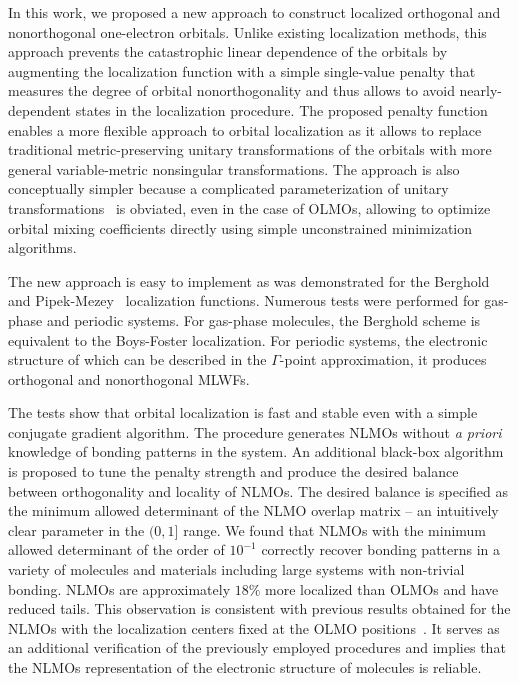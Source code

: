 \documentclass[aps,prl,reprint,amsmath,amssymb]{revtex4-1}
\begin{document}
In this work, we proposed a new approach to construct localized orthogonal and nonorthogonal one-electron orbitals. 
Unlike existing localization methods, this approach prevents the catastrophic linear dependence of the orbitals by augmenting the localization function with a simple single-value penalty that measures the degree of orbital nonorthogonality and thus allows to avoid nearly-dependent states in the localization procedure.
%
The proposed penalty function enables a more flexible approach to orbital localization as it allows to replace traditional metric-preserving unitary transformations of the orbitals with more general variable-metric nonsingular transformations. The approach is also conceptually simpler because a complicated parameterization of unitary transformations~\cite{hoyvik2017generalising} is obviated, even in the case of OLMOs, allowing to optimize orbital mixing coefficients directly using simple unconstrained minimization algorithms. 

The new approach is easy to implement as was demonstrated for the Berghold~\cite{berghold2000general} and Pipek-Mezey~\cite{pipek1989fast} localization functions. 
Numerous tests were performed for gas-phase and periodic systems. For gas-phase molecules, the Berghold scheme is equivalent to the Boys-Foster localization. 
For periodic systems, the electronic structure of which can be described in the $\Gamma$-point approximation, it produces orthogonal and nonorthogonal MLWFs. 

The tests show that orbital localization is fast and stable even with a simple conjugate gradient algorithm. The procedure generates NLMOs without \emph{a priori} knowledge of bonding patterns in the system. 
An additional black-box algorithm is proposed to tune the penalty strength and produce the desired balance between orthogonality and locality of NLMOs. The desired balance is specified as the minimum allowed determinant of the NLMO overlap matrix -- an intuitively clear parameter in the $(0,1]$ range. 
We found that NLMOs with the minimum allowed determinant of the order of $10^{-1}$ correctly recover bonding patterns in a variety of molecules and materials including large systems with non-trivial bonding. NLMOs are approximately $18\%$ more localized than OLMOs and have reduced tails.
This observation is consistent with previous results obtained for the NLMOs with the localization centers fixed at the OLMO positions~\cite{feng2004An_efficient, cui2010efficient}. It serves as an additional verification of the previously employed procedures and implies that the NLMOs representation of the electronic structure of molecules is reliable. 
\end{document}
